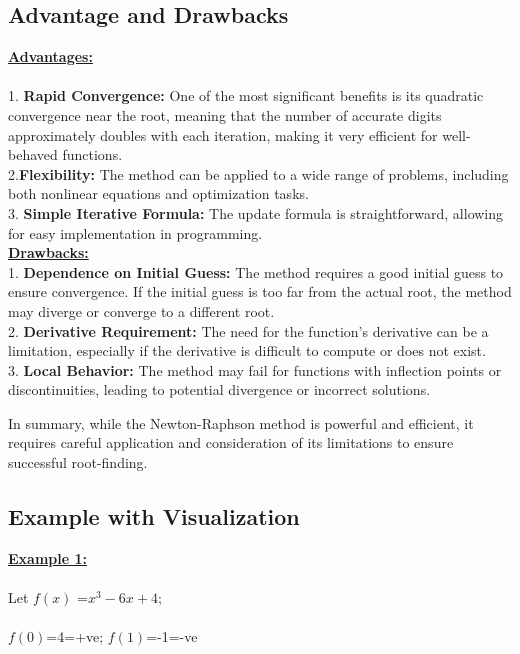 \documentclass[12pt,a4paper]{article}
\begin{document}
	
	
	
	\newpage\subsection{Advantage and Drawbacks} 
	\textbf{\underline{Advantages:} }\\ \\ \vspace{0.5cm}
	1. \textbf{Rapid Convergence:} One of the most significant benefits is its quadratic convergence near the root, meaning that the number of accurate digits approximately doubles with each iteration, making it very efficient for well-behaved functions.\\
	
	2.\textbf{Flexibility:} The method can be applied to a wide range of problems, including both nonlinear equations and optimization tasks.\\
	
	3. \textbf{Simple Iterative Formula:} The update formula is straightforward, allowing for easy implementation in programming. \\
	
	\textbf{\underline{Drawbacks:} }\vspace{0.5cm}\\
	1. \textbf{Dependence on Initial Guess:} The method requires a good initial guess to ensure convergence. If the initial guess is too far from the actual root, the method may diverge or converge to a different root.\\
	
	2. \textbf{Derivative Requirement:} The need for the function’s derivative can be a limitation, especially if the derivative is difficult to compute or does not exist.\\
	
	3. \textbf{Local Behavior:} The method may fail for functions with inflection points or discontinuities, leading to potential divergence or incorrect solutions.
	
	In summary, while the Newton-Raphson method is powerful and efficient, it requires careful application and consideration of its limitations to ensure successful root-finding.
	\newpage\subsection{Example with Visualization} 
	
	
	\textbf{\underline{Example 1:}} \\ \\
	Let \(f(x)\) =$ x^{3}-6x+4;$ \\ \\
	\(f(0)\)=4=+ve; \(f(1)\)=-1=-ve\\
	
\end{document}
